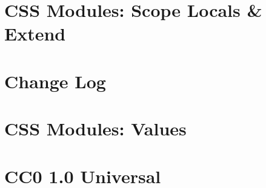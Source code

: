 \documentclass[twoside]{book}
\newcommand{\+}{\discretionary{\mbox{\scriptsize$\hookleftarrow$}}{}{}}
\begin{document}
\chapter{CSS Modules\+: Scope Locals \& Extend}
\label{md__c___users_vaishnavi_jadhav__desktop__developer_code_mean_stack_example_client_node_modules_p08a05533e21109ed9a38375fd30abf28}

\chapter{Change Log}
\label{md__c___users_vaishnavi_jadhav__desktop__developer_code_mean_stack_example_client_node_modules_p95cf7134acf7682f97f0c58e997cebfc}

\chapter{CSS Modules\+: Values}
\label{md__c___users_vaishnavi_jadhav__desktop__developer_code_mean_stack_example_client_node_modules_pda21485fe5cc421df830310f014fcb16}

\chapter{CC0 1.0 Universal}
\label{md__c___users_vaishnavi_jadhav__desktop__developer_code_mean_stack_example_client_node_modules_postcss_nesting__l_i_c_e_n_s_e}

\end{document}
